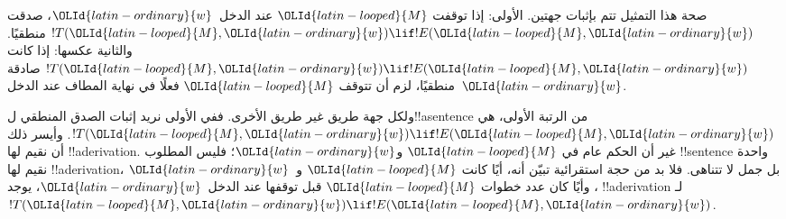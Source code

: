 \documentclass[../../../include/open-logic-section]{subfiles}
\begin{document}

\begin{explain}
صحة هذا التمثيل تتم بإثبات جهتين. الأولى: إذا توقفت ${\OLId{latin-looped}{M}}$ عند
الدخل~${\OLId{latin-ordinary}{w}}$، صدقت $!T({\OLId{latin-looped}{M}},{\OLId{latin-ordinary}{w}})\lif !E({\OLId{latin-looped}{M}},{\OLId{latin-ordinary}{w}})$ منطقيًا. والثانية عكسها:
إذا كانت $!T({\OLId{latin-looped}{M}},{\OLId{latin-ordinary}{w}})\lif !E({\OLId{latin-looped}{M}},{\OLId{latin-ordinary}{w}})$ صادقة منطقيًا، لزم أن تتوقف
${\OLId{latin-looped}{M}}$ فعلًا في نهاية المطاف عند الدخل~${\OLId{latin-ordinary}{w}}$.

ولكل جهة طريق غير طريق الأخرى. ففي الأولى نريد إثبات الصدق
المنطقي ل!!a{sentence} من الرتبة الأولى، هي
$!T({\OLId{latin-looped}{M}},{\OLId{latin-ordinary}{w}})\lif !E({\OLId{latin-looped}{M}},{\OLId{latin-ordinary}{w}})$. وأيسر ذلك أن نقيم لها !!a{derivation}.
غير أن الحكم عام في ${\OLId{latin-looped}{M}}$ و${\OLId{latin-ordinary}{w}}$؛ فليس المطلوب !!{sentence}
واحدة نقيم لها !!a{derivation}، بل جمل لا تتناهى. فلا بد من
حجة استقرائية تبيّن أنه، أيًا كانت ${\OLId{latin-looped}{M}}$ و~${\OLId{latin-ordinary}{w}}$، وأيًا كان عدد
خطوات ${\OLId{latin-looped}{M}}$ قبل توقفها عند الدخل~${\OLId{latin-ordinary}{w}}$، يوجد !!a{derivation}
لـ$!T({\OLId{latin-looped}{M}},{\OLId{latin-ordinary}{w}})\lif !E({\OLId{latin-looped}{M}},{\OLId{latin-ordinary}{w}})$.


\end{explain}
\end{document}
